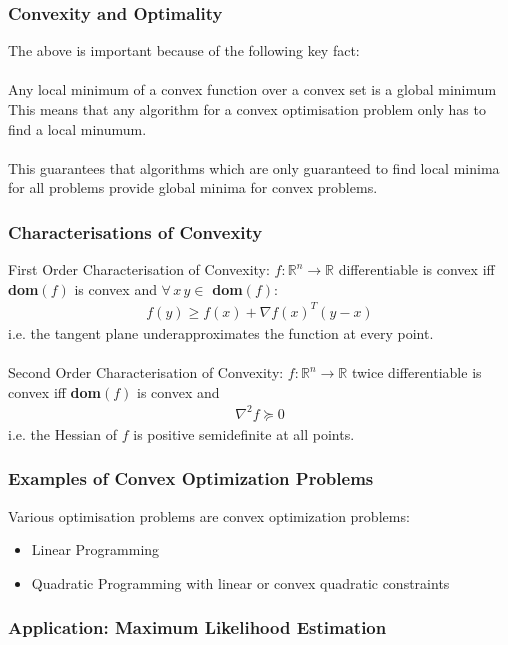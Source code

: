 \documentclass{beamer}
\def\rnum{\mathbb{R}}
\begin{document}
\begin{frame}
    \frametitle{Convexity and Optimality}
    The above is important because of the following key fact:
    \\~\\
    Any local minimum of a convex function over a convex set is a global
    minimum
    This means that any algorithm for a convex optimisation problem only has to
    find a local minumum.
    \\~\\
    This guarantees that algorithms which are only
    guaranteed to find local minima for all problems provide global minima for
    convex problems.
\end{frame}

\begin{frame}
    \frametitle{Characterisations of Convexity}
    First Order Characterisation of Convexity: $f : \rnum^{n} \rightarrow \rnum$
    differentiable is convex iff \textbf{dom}$(f)$ is convex and $\forall \, x
    \, y \in$ \textbf{dom}$(f)$:
    \begin{align*}
        f(y) \geq f(x) + \nabla f(x)^{T}(y-x)
    \end{align*}
    i.e. the tangent plane underapproximates the function at every point.
    \\~\\
    Second Order Characterisation of Convexity: $f : \rnum^{n} \rightarrow
    \rnum$ twice differentiable is convex iff \textbf{dom}$(f)$ is convex and
    \begin{align*}
        \nabla^{2}f \succeq 0
    \end{align*}
    i.e. the Hessian of $f$ is positive semidefinite at all points.
\end{frame}

\begin{frame}
    \frametitle{Examples of Convex Optimization Problems}
    Various optimisation problems are convex optimization problems:
    \begin{itemize}
        \item Linear Programming
        \item Quadratic Programming with linear or convex quadratic constraints
    \end{itemize}
\end{frame}

\begin{frame}
    \frametitle{Application: Maximum Likelihood Estimation}
\end{frame}
\end{document}
